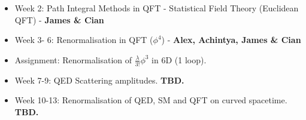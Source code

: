 
\begin{itemize}
    \item Week 2: Path Integral Methods in QFT - Statistical Field Theory (Euclidean QFT) - \textbf{James \& Cian}
    \item Week 3- 6: Renormalisation in QFT ($\phi^{4}$) - \textbf{Alex, Achintya, James \& Cian}
    \item Assignment: Renormalisation of $\frac{\lambda}{3!} \phi^{3}$ in 6D (1 loop).
    \item Week 7-9: QED Scattering amplitudes. \textbf{TBD.}
    \item Week 10-13: Renormalisation of QED, SM and QFT on curved spacetime. \textbf{TBD.}
\end{itemize}
